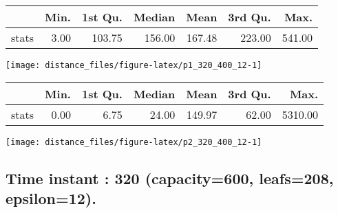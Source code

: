 \documentclass[
  9pt,
  landscape]{article}
\begin{document}
\begin{minipage}{0.5\textwidth} 
\centering 
\begin{tabular}{rrrrrrr}
  \hline
 & Min. & 1st Qu. & Median & Mean & 3rd Qu. & Max. \\ 
  \hline
stats & 3.00 & 103.75 & 156.00 & 167.48 & 223.00 & 541.00 \\ 
   \hline
\end{tabular}
\vspace{0.5cm} 


\texttt{[image: distance\_files/figure-latex/p1\_320\_400\_12-1]} 

\end{minipage} 
\begin{minipage}{0.5\textwidth} 
\centering 
\begin{tabular}{rrrrrrr}
  \hline
 & Min. & 1st Qu. & Median & Mean & 3rd Qu. & Max. \\ 
  \hline
stats & 0.00 & 6.75 & 24.00 & 149.97 & 62.00 & 5310.00 \\ 
   \hline
\end{tabular}
\vspace{0.5cm} 


\texttt{[image: distance\_files/figure-latex/p2\_320\_400\_12-1]} 

\end{minipage}

\pagebreak

\hypertarget{time-instant-320-capacity600-leafs208-epsilon12.}{%
\subsection{Time instant : 320 (capacity=600, leafs=208,
epsilon=12).}\label{time-instant-320-capacity600-leafs208-epsilon12.}}
\end{document}
